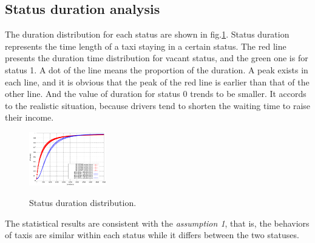 \subsection{Status duration analysis}
  The duration distribution for each status are shown in fig.\ref{figure_duration_for_each_status}. Status duration represents the time length of a taxi staying in a certain status. The red line presents the duration time distribution for vacant status, and the green one is for status 1. A dot of the line means the proportion of the duration. A peak exists in each line, and it is obvious that the peak of the red line is earlier than that of the other line. And the value of duration for status 0 trends to be smaller. It accords to the realistic situation, because drivers tend to shorten the waiting time to raise their income.
\begin{figure}[!h]
\centering
\includegraphics[width=0.3\textwidth]{figures_201103/assumption/durationdis.eps}\\
\caption{Status duration distribution.}\label{figure_duration_for_each_status}
\end{figure}

The statistical results are consistent with the \emph{assumption 1}, that is, the behaviors of taxis are similar within each status while it differs between the two statuses.

